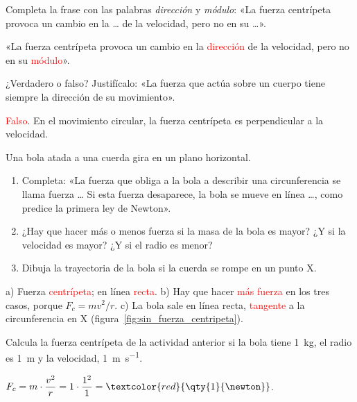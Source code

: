 \begin{exercise}
    Completa la frase con las palabras \emph{dirección} y \emph{módulo}: «La fuerza centrípeta provoca un cambio en la \ldots{} de la velocidad, pero no en su \ldots».
    \begin{solu}
        «La fuerza centrípeta provoca un cambio en la \textcolor{red}{dirección} de la velocidad, pero no en su \textcolor{red}{módulo}».
    \end{solu}
\end{exercise}

\begin{exercise}
    ¿Verdadero o falso? Justifícalo: «La fuerza que actúa sobre un cuerpo tiene siempre la dirección de su movimiento».
    \begin{solu}
        \textcolor{red}{Falso}. En el movimiento circular, la fuerza centrípeta es perpendicular a la velocidad.
    \end{solu}
\end{exercise}

\begin{exercise}
    Una bola atada a una cuerda gira en un plano horizontal.
    \begin{enumerate}[label=\alph*)]
        \item Completa: «La fuerza que obliga a la bola a describir una circunferencia se llama fuerza \ldots{} Si esta fuerza desaparece, la bola se mueve en línea \ldots, como predice la primera ley de Newton».
        \item ¿Hay que hacer más o menos fuerza si la masa de la bola es mayor? ¿Y si la velocidad es mayor? ¿Y si el radio es menor?
        \item Dibuja la trayectoria de la bola si la cuerda se rompe en un punto X.
    \end{enumerate}
    \begin{solu}
        a) Fuerza \textcolor{red}{centrípeta}; en línea \textcolor{red}{recta}. b) Hay que hacer \textcolor{red}{más fuerza} en los tres casos, porque \(F_c = m v^2 / r\). c) La bola sale en línea recta, \textcolor{red}{tangente} a la circunferencia en X (figura~\ref{fig:sin_fuerza_centripeta}).
    \end{solu}
\end{exercise}

\begin{exercise}
    Calcula la fuerza centrípeta de la actividad anterior si la bola tiene \qty{1}{\kg}, el radio es \qty{1}{\m} y la velocidad, \qty{1}{\m\per\s}.
    \begin{solu}
        \(F_c = m \cdot \dfrac{v^2}{r} = 1 \cdot \dfrac{1^2}{1} = \textcolor{red}{\qty{1}{\newton}}\).
    \end{solu}
\end{exercise}

